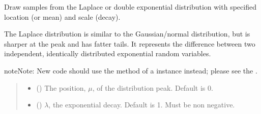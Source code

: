 \documentclass[letterpaper,10pt,english]{sphinxmanual}
\begin{document}
\begin{fulllineitems}
\label{\detokenize{metilda.controllers:metilda.controllers.pitch_art_wizard.laplace}}
\pysigstartsignatures
{}
\pysigstopsignatures
\sphinxAtStartPar
Draw samples from the Laplace or double exponential distribution with
specified location (or mean) and scale (decay).

\sphinxAtStartPar
The Laplace distribution is similar to the Gaussian/normal distribution,
but is sharper at the peak and has fatter tails. It represents the
difference between two independent, identically distributed exponential
random variables.

\begin{sphinxadmonition}{note}{Note:}
\sphinxAtStartPar
New code should use the 
method of a  instance instead;
please see the .
\end{sphinxadmonition}
\begin{quote}\begin{description}
\begin{itemize}
\item {} 
\sphinxAtStartPar
{} (\sphinxstyleliteralemphasis{\sphinxupquote{, }}) \textendash{} The position, \(\mu\), of the distribution peak. Default is 0.

\item {} 
\sphinxAtStartPar
{} (\sphinxstyleliteralemphasis{\sphinxupquote{, }}) \textendash{} \(\lambda\), the exponential decay. Default is 1. Must be non\sphinxhyphen{}
negative.


\end{itemize}
\end{description}
\end{quote}
\end{fulllineitems}
\end{document}
